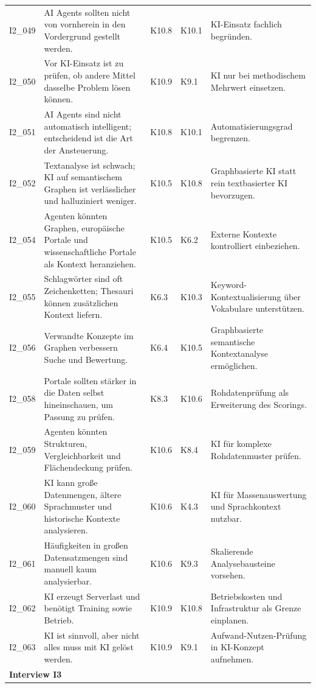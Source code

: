 \begin{longtable}{p{0.9cm} p{6cm} p{0.9cm} p{0.9cm} p{6cm}}
I2\_049 & AI Agents sollten nicht von vornherein in den Vordergrund gestellt werden. & K10.8 & K10.1 & KI-Einsatz fachlich begründen. \\
I2\_050 & Vor KI-Einsatz ist zu prüfen, ob andere Mittel dasselbe Problem lösen können. & K10.9 & K9.1 & KI nur bei methodischem Mehrwert einsetzen. \\
I2\_051 & AI Agents sind nicht automatisch intelligent; entscheidend ist die Art der Ansteuerung. & K10.8 & K10.1 & Automatisierungsgrad begrenzen. \\
I2\_052 & Textanalyse ist schwach; KI auf semantischem Graphen ist verlässlicher und halluziniert weniger. & K10.5 & K10.8 & Graphbasierte KI statt rein textbasierter KI bevorzugen. \\
I2\_054 & Agenten könnten Graphen, europäische Portale und wissenschaftliche Portale als Kontext heranziehen. & K10.5 & K6.2 & Externe Kontexte kontrolliert einbeziehen. \\
I2\_055 & Schlagwörter sind oft Zeichenketten; Thesauri können zusätzlichen Kontext liefern. & K6.3 & K10.3 & Keyword-Kontextualisierung über Vokabulare unterstützen. \\
I2\_056 & Verwandte Konzepte im Graphen verbessern Suche und Bewertung. & K6.4 & K10.5 & Graphbasierte semantische Kontextanalyse ermöglichen. \\
I2\_058 & Portale sollten stärker in die Daten selbst hineinschauen, um Passung zu prüfen. & K8.3 & K10.6 & Rohdatenprüfung als Erweiterung des Scorings. \\
I2\_059 & Agenten könnten Strukturen, Vergleichbarkeit und Flächendeckung prüfen. & K10.6 & K8.4 & KI für komplexe Rohdatenmuster prüfen. \\
I2\_060 & KI kann große Datenmengen, ältere Sprachmuster und historische Kontexte analysieren. & K10.6 & K4.3 & KI für Massenauswertung und Sprachkontext nutzbar. \\
I2\_061 & Häufigkeiten in großen Datensatzmengen sind manuell kaum analysierbar. & K10.6 & K9.3 & Skalierende Analysebausteine vorsehen. \\
I2\_062 & KI erzeugt Serverlast und benötigt Training sowie Betrieb. & K10.9 & K10.8 & Betriebskosten und Infrastruktur als Grenze einplanen. \\
I2\_063 & KI ist sinnvoll, aber nicht alles muss mit KI gelöst werden. & K10.9 & K9.1 & Aufwand-Nutzen-Prüfung in KI-Konzept aufnehmen. \\
\multicolumn{5}{l}{\textbf{Interview I3}} \\

\end{longtable}
